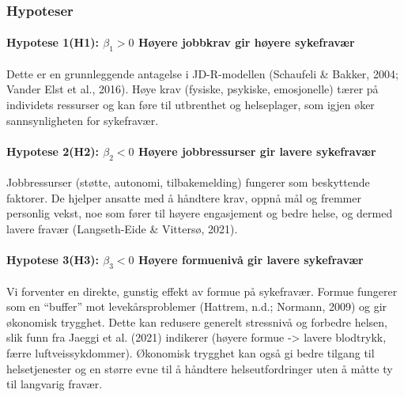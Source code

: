 \documentclass[
  12pt,
  a4paper,
  DIV=11,
  numbers=noendperiod]{scrartcl}
\let\oldparagraph\paragraph
\renewcommand{\paragraph}[1]{\oldparagraph{#1}\mbox{}}
\begin{document}
\subsubsection{Hypoteser}\label{sec-hypot}

\paragraph{\texorpdfstring{Hypotese 1(H1): \(\beta_1 > 0\) Høyere
jobbkrav gir høyere
sykefravær}{Hypotese 1(H1): \textbackslash beta\_1 \textgreater{} 0 Høyere jobbkrav gir høyere sykefravær}}\label{hypotese-1h1-beta_1-0-huxf8yere-jobbkrav-gir-huxf8yere-sykefravuxe6r}

Dette er en grunnleggende antagelse i JD-R-modellen (Schaufeli \&
Bakker, 2004; Vander Elst et al., 2016). Høye krav (fysiske, psykiske,
emosjonelle) tærer på individets ressurser og kan føre til utbrenthet og
helseplager, som igjen øker sannsynligheten for sykefravær.

\paragraph{\texorpdfstring{Hypotese 2(H2): \(\beta_2 < 0\) Høyere
jobbressurser gir lavere
sykefravær}{Hypotese 2(H2): \textbackslash beta\_2 \textless{} 0 Høyere jobbressurser gir lavere sykefravær}}\label{hypotese-2h2-beta_2-0-huxf8yere-jobbressurser-gir-lavere-sykefravuxe6r}

Jobbressurser (støtte, autonomi, tilbakemelding) fungerer som
beskyttende faktorer. De hjelper ansatte med å håndtere krav, oppnå mål
og fremmer personlig vekst, noe som fører til høyere engasjement og
bedre helse, og dermed lavere fravær (Langseth-Eide \& Vittersø, 2021).

\paragraph{\texorpdfstring{Hypotese 3(H3): \(\beta_3 < 0\) Høyere
formuenivå gir lavere
sykefravær}{Hypotese 3(H3): \textbackslash beta\_3 \textless{} 0 Høyere formuenivå gir lavere sykefravær}}\label{hypotese-3h3-beta_3-0-huxf8yere-formuenivuxe5-gir-lavere-sykefravuxe6r}

Vi forventer en direkte, gunstig effekt av formue på sykefravær. Formue
fungerer som en ``buffer'' mot levekårsproblemer (Hattrem, n.d.;
Normann, 2009) og gir økonomisk trygghet. Dette kan redusere generelt
stressnivå og forbedre helsen, slik funn fra Jaeggi et al. (2021)
indikerer (høyere formue -\textgreater{} lavere blodtrykk, færre
luftveissykdommer). Økonomisk trygghet kan også gi bedre tilgang til
helsetjenester og en større evne til å håndtere helseutfordringer uten å
måtte ty til langvarig fravær.
\end{document}
